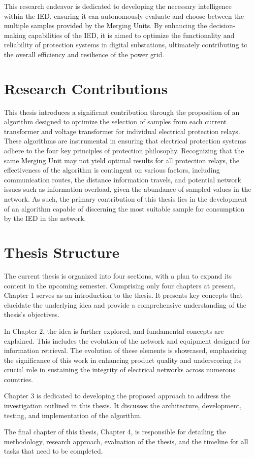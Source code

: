 This research endeavor is dedicated to developing the necessary intelligence within the IED, ensuring it can autonomously evaluate and choose between the multiple samples provided by the Merging Units. By enhancing the decision-making capabilities of the IED, it is aimed to optimize the functionality and reliability of protection systems in digital substations, ultimately contributing to the overall efficiency and resilience of the power grid.

\section{Research Contributions}
This thesis introduces a significant contribution through the proposition of an algorithm designed to optimize the selection of samples from each current transformer and voltage transformer for individual electrical protection relays. These algorithms are instrumental in ensuring that electrical protection systems adhere to the four key principles of protection philosophy. Recognizing that the same Merging Unit may not yield optimal results for all protection relays, the effectiveness of the algorithm is contingent on various factors, including communication routes, the distance information travels, and potential network issues such as information overload, given the abundance of sampled values in the network. As such, the primary contribution of this thesis lies in the development of an algorithm capable of discerning the most suitable sample for consumption by the IED in the network.

\section{Thesis Structure}
The current thesis is organized into four sections, with a plan to expand its content in the upcoming semester. Comprising only four chapters at present, Chapter 1 serves as an introduction to the thesis. It presents key concepts that elucidate the underlying idea and provide a comprehensive understanding of the thesis's objectives.

In Chapter 2, the idea is further explored, and fundamental concepts are explained. This includes the evolution of the network and equipment designed for information retrieval. The evolution of these elements is showcased, emphasizing the significance of this work in enhancing product quality and underscoring its crucial role in sustaining the integrity of electrical networks across numerous countries.

Chapter 3 is dedicated to developing the proposed approach to address the investigation outlined in this thesis. It discusses the architecture, development, testing, and implementation of the algorithm.

The final chapter of this thesis, Chapter 4, is responsible for detailing the methodology, research approach, evaluation of the thesis, and the timeline for all tasks that need to be completed.